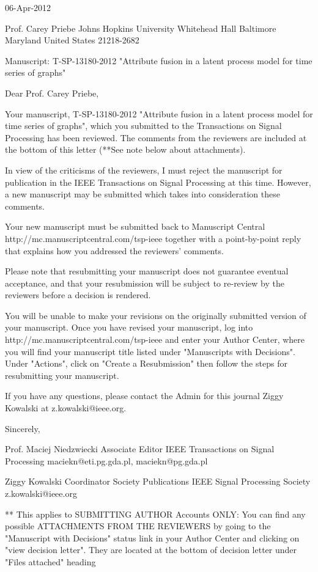 06-Apr-2012

Prof. Carey Priebe
Johns Hopkins University
Whitehead Hall
Baltimore
Maryland
United States
21218-2682


Manuscript: T-SP-13180-2012 "Attribute fusion in a latent process
model for time series of graphs"

Dear Prof. Carey Priebe,

Your manuscript, T-SP-13180-2012 "Attribute fusion in a latent process
model for time series of graphs", which you submitted to the
Transactions on Signal Processing has been reviewed. The comments from
the reviewers are included at the bottom of this letter (**See note
below about attachments).

In view of the criticisms of the reviewers, I must reject the
manuscript for publication in the IEEE Transactions on Signal
Processing at this time. However, a new manuscript may be submitted
which takes into consideration these comments.

Your new manuscript must be submitted back to Manuscript Central
http://mc.manuscriptcentral.com/tsp-ieee together with a
point-by-point reply that explains how you addressed the reviewers'
comments.

Please note that resubmitting your manuscript does not guarantee
eventual acceptance, and that your resubmission will be subject to
re-review by the reviewers before a decision is rendered.

You will be unable to make your revisions on the originally submitted
version of your manuscript. Once you have revised your manuscript, log
into http://mc.manuscriptcentral.com/tsp-ieee and enter your Author
Center, where you will find your manuscript title listed under
"Manuscripts with Decisions". Under "Actions", click on "Create a
Resubmission" then follow the steps for resubmitting your manuscript.

If you have any questions, please contact the Admin for this journal
Ziggy Kowalski at z.kowalski@ieee.org.

Sincerely,

Prof. Maciej Niedzwiecki
Associate Editor
IEEE Transactions on Signal Processing
maciekn@eti.pg.gda.pl, maciekn@pg.gda.pl

Ziggy Kowalski
Coordinator Society Publications
IEEE Signal Processing Society
z.kowalski@ieee.org

** {This applies to SUBMITTING AUTHOR Accounts ONLY: You can find any
   possible ATTACHMENTS FROM THE REVIEWERS by going to the "Manuscript
   with Decisions" status link in your Author Center and clicking on
   "view decision letter". They are located at the bottom of decision
   letter under "Files attached" heading}

